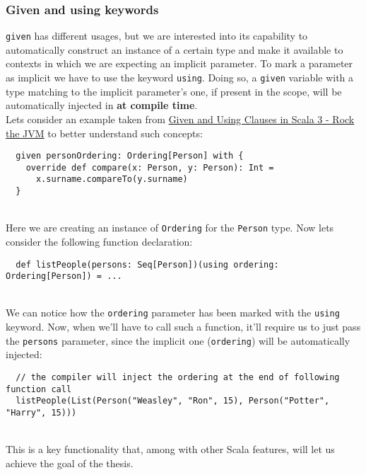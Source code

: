 \subsubsection{Given and using keywords}
\label{par:given-using}
\texttt{given} has different usages, but we are interested into its capability to automatically construct an instance of a certain type and make it available to contexts in which we are expecting an implicit parameter.
To mark a parameter as implicit we have to use the keyword \texttt{using}.
Doing so, a \texttt{given} variable with a type matching to the implicit parameter's one, if present in the scope, will be automatically injected in \textbf{at compile time}.\\
Lets consider an example taken from \href{https://blog.rockthejvm.com/scala-3-given-using/}{Given and Using Clauses in Scala 3 - Rock the JVM} to better understand such concepts:
\begin{verbatim}
  given personOrdering: Ordering[Person] with {
    override def compare(x: Person, y: Person): Int = 
      x.surname.compareTo(y.surname)
  }
\end{verbatim}\mbox{}\\
Here we are creating an instance of \texttt{Ordering} for the \texttt{Person} type.
Now lets consider the following function declaration:
\begin{verbatim}
  def listPeople(persons: Seq[Person])(using ordering: Ordering[Person]) = ...
\end{verbatim}\mbox{}\\
We can notice how the \texttt{ordering} parameter has been marked with the \texttt{using} keyword.
Now, when we'll have to call such a function, it'll require us to just pass the \texttt{persons} parameter, since the implicit one (\texttt{ordering}) will be automatically injected:
\begin{verbatim}
  // the compiler will inject the ordering at the end of following function call
  listPeople(List(Person("Weasley", "Ron", 15), Person("Potter", "Harry", 15)))
\end{verbatim}\mbox{}\\
This is a key functionality that, among with other Scala features, will let us achieve the goal of the thesis.


